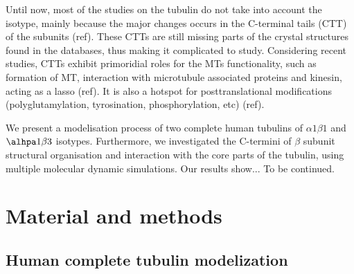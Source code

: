 \documentclass[a4paper]{article}
\begin{document}
Until now, most of the studies on the tubulin do not take into account the isotype, mainly
because the major changes occurs in the C-terminal tails (CTT) of the subunits (ref). These CTTs
are still missing parts of the crystal structures found in the databases, thus making it
complicated to study. Considering recent studies, CTTs exhibit primoridial roles for the
MTs functionality, such as formation of MT, interaction with microtubule associated proteins and
kinesin, acting as a lasso (ref). It is also a hotspot for posttranslational modifications
(polyglutamylation, tyrosination, phosphorylation, etc) (ref).

We present a modelisation process of two complete human tubulins of $\alpha1\beta1$ and
$\alhpa1\beta3$ isotypes. Furthermore, we investigated the C-termini of $\beta$ subunit
structural organisation and interaction with the core parts of the tubulin, using
multiple molecular dynamic simulations. Our results show... To be continued.

\section{Material and methods}

\subsection{Human complete tubulin modelization}

\end{document}

